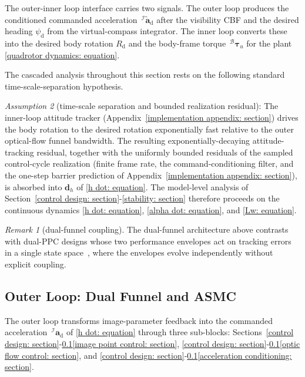 \documentclass{IEEEtaes}
\begin{document}
The outer-inner loop interface carries two signals. The outer loop produces the conditioned commanded acceleration $\,^\mathcal{I}\tilde{\boldsymbol{a}}_\text{d}$ after the visibility CBF and the desired heading $\psi_\text{d}$ from the virtual-compass integrator. The inner loop converts these into the desired body rotation $R_\text{d}$ and the body-frame torque $\,^\mathcal{B}\boldsymbol{\tau}_u$ for the plant \eqref{quadrotor dynamics: equation}.

The cascaded analysis throughout this section rests on the following standard time-scale-separation hypothesis.

\textit{Assumption 2} (time-scale separation and bounded realization residual): The inner-loop attitude tracker (Appendix~\ref{implementation appendix: section}) drives the body rotation to the desired rotation exponentially fast relative to the outer optical-flow funnel bandwidth. The resulting exponentially-decaying attitude-tracking residual, together with the uniformly bounded residuals of the sampled control-cycle realization (finite frame rate, the command-conditioning filter, and the one-step barrier prediction of Appendix~\ref{implementation appendix: section}), is absorbed into $\boldsymbol{d}_h$ of \eqref{h dot: equation}. The model-level analysis of Section~\ref{control design: section}-\ref{stability: section} therefore proceeds on the continuous dynamics \eqref{h dot: equation}, \eqref{alpha dot: equation}, and \eqref{Lw: equation}.

\textit{Remark 1} (dual-funnel coupling). The dual-funnel architecture above contrasts with dual-PPC designs whose two performance envelopes act on tracking errors in a single state space~\cite{lin2022}, where the envelopes evolve independently without explicit coupling.

\subsection{Outer Loop: Dual Funnel and ASMC} \label{outer loop: section}
The outer loop transforms image-parameter feedback into the commanded acceleration $\,^\mathcal{I}\boldsymbol{a}_\text{d}$ of \eqref{h dot: equation} through three sub-blocks: Sections~\ref{control design: section}-\ref{outer loop: section}\ref{image point control: section}, \ref{control design: section}-\ref{outer loop: section}\ref{optic flow control: section}, and \ref{control design: section}-\ref{outer loop: section}\ref{acceleration conditioning: section}.
\end{document}
